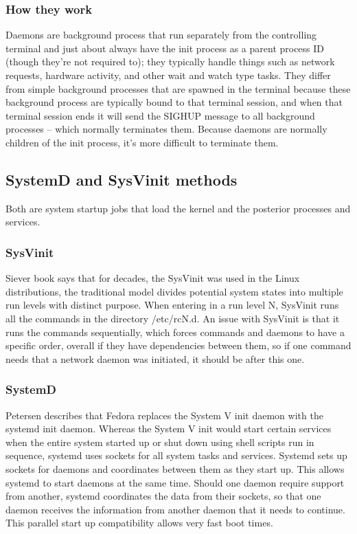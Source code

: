 \documentclass[10pt]{article}
\begin{document}
\subsubsection{How they work}
Daemons are background process that run separately from the controlling terminal and just about always have the init process as a parent process ID (though they’re not required to); they typically handle things such as network requests, hardware activity, and other wait and watch type tasks. They differ from simple background processes that are spawned in the terminal because these background process are typically bound to that terminal session, and when that terminal session ends it will send the SIGHUP message to all background processes – which normally terminates them. Because daemons are normally children of the init process, it’s more difficult to terminate them.\cite{Krauss}

\subsection{SystemD and SysVinit methods}

Both are system startup jobs that load the kernel and the posterior processes and services.

\subsubsection{SysVinit}
Siever \cite{Siever} book says that for decades, the SysVinit was used in the Linux distributions, the traditional model divides potential system states into multiple run levels with distinct purpose. When entering in a run level N, SysVinit runs all the commands in the directory /etc/rcN.d. An issue with SysVinit is that it runs the commands sequentially, which forces commands and daemons to have a specific order, overall if they have dependencies between them, so if one command needs that a network daemon was initiated, it should be after this one.

\subsubsection{SystemD}
Petersen \cite{Petersen} describes that Fedora replaces the System V init daemon with the systemd init daemon. Whereas the System V init would start certain services when the entire system started up or shut down using shell scripts run in sequence, systemd uses sockets for all system tasks and services. Systemd sets up sockets for daemons and coordinates between them as they start up. This allows systemd to start daemons at the same time. Should one daemon require support from another, systemd coordinates the data from their sockets, so that one daemon receives the information from another daemon that it needs to continue. This parallel start up compatibility allows very fast boot times.\newline
\end{document}
